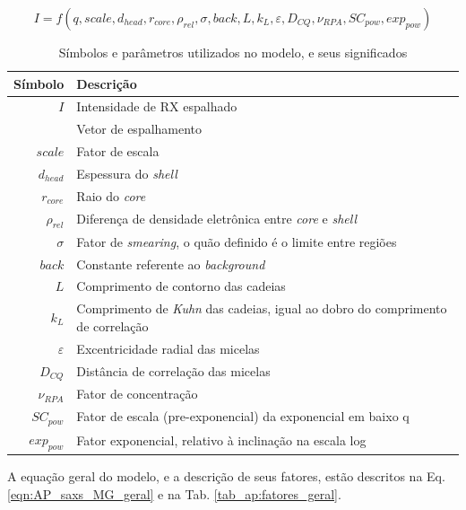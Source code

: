 \begin{apendicesenv}
\begin{equation}
I = f(q, scale, d_{head}, r_{core}, \rho_{rel}, \sigma, back, L, k_L, \varepsilon, D_{CQ}, \nu_{RPA}, SC_{pow}, exp_{pow})
\label{eqn:AP_saxs_MG_superficial}
\end{equation}
\begin{table}
    \IBGEtab%
    {\caption{Símbolos e parâmetros utilizados no modelo, e seus significados}
     \label{tab_ap:simbolos} }%
    {\begin{tabular}{r p{8cm}}
    	\toprule
     Símbolo 			& Descrição        						\\
     \midrule
     $I$					& Intensidade de RX espalhado			\\
     \q					& Vetor de espalhamento					\\
     \midrule
     $scale$				& Fator de escala						\\
     $d_{head}$			& Espessura do \emph{shell}				\\
     $r_{core}$			& Raio do \emph{core}					\\
     $\rho_{rel}$		& Diferença de densidade eletrônica entre \emph{core} e \emph{shell} \\
     $\sigma$			& Fator de \emph{smearing}, o quão definido é o limite entre regiões \\
     $back$				& Constante referente ao \emph{background} \\
     $L$					& Comprimento de contorno das cadeias 	\\
     $k_L$				& Comprimento de \emph{Kuhn} das cadeias, igual ao dobro do comprimento de correlação \\ %
     $\varepsilon$			& Excentricidade radial das micelas		\\
     $D_{CQ}$			& Distância de correlação das micelas 	\\
     $\nu_{RPA}$			& Fator de concentração					\\
     \midrule
     $SC_{pow}$			& Fator de escala (pre-exponencial) da exponencial em baixo q\\
     $exp_{pow}$			& Fator exponencial, relativo à inclinação na escala log\\
     \bottomrule
    \end{tabular}}%
    {}%
\end{table}

A equação geral do modelo, e a descrição de seus fatores, estão descritos na Eq.\ref{eqn:AP_saxs_MG_geral} e na Tab. \ref{tab_ap:fatores_geral}.


\end{apendicesenv}
